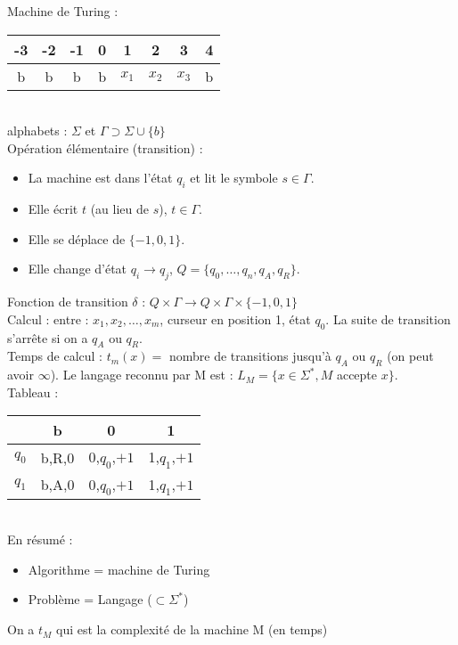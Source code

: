 \documentclass[12pt,a4paper]{report}
\begin{document}
Machine de Turing :\\

\begin{tabular}{c|c|c|c|c|c|c|c}\hline
-3 & -2 & -1 & 0 & 1 & 2 & 3 & 4 \\\hline 
b &b& b& b& $x_1$ & $x_2$ & $x_3$ & b \\\hline
\end{tabular}\\

alphabets : $\Sigma$  et $\Gamma \supset \Sigma \cup \{b\} $\\

Opération élémentaire (transition) :
\begin{itemize}
\item La machine est dans l'état $q_i$ et lit le symbole $s \in \Gamma$.
\item Elle écrit $t$ (au lieu de $s$), $ t\in \Gamma$.
\item Elle se déplace de $\{-1,0,1\}$.
\item Elle change d'état $q_i \rightarrow q_j$, $Q=\{q_0,\ldots,q_n,q_A,q_R\}$.
\end{itemize}
Fonction de transition $\delta$ : $Q\times \Gamma \longrightarrow Q\times \Gamma \times \{-1,0,1\}$\\
Calcul : entre : $x_1,x_2,\ldots, x_m$, curseur en position 1, état $q_0$. La suite de transition s'arrête si on a $q_A$ ou $q_R$.\\
Temps de calcul : $t_m(x) = $ nombre de transitions jusqu'à $q_A$ ou $q_R$ (on peut avoir $\infty$). Le langage reconnu par M est : 
$L_M =\{x \in \Sigma^*, M $ accepte $ x\}$.\\
Tableau :\\

\begin{tabular}{|c|c|c|c|}\hline
 & b & 0 & 1 \\\hline
$q_0$ & b,R,0 & 0,$q_0$,$+1$ & 1,$q_1$,$+1$ \\\hline
$q_1$ & b,A,0 & 0,$q_0$,$+1$ & 1,$q_1$,$+1$ \\\hline
\end{tabular}\\
En résumé :
\begin{itemize}
\item Algorithme = machine de Turing 
\item Problème = Langage ($\subset \Sigma^*$)
\end{itemize}
On a $t_M$ qui est la complexité de la machine M (en temps)
\end{document}
